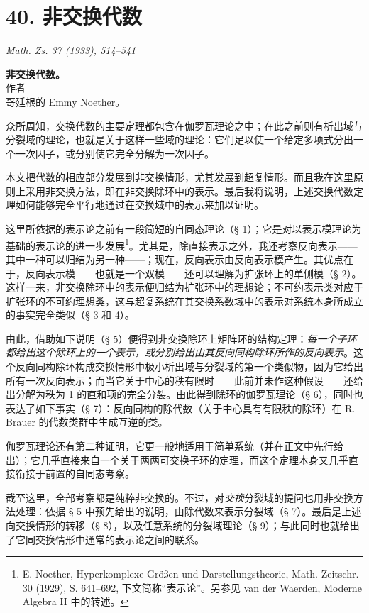 \section*{40. 非交换代数}

\begin{center}
\emph{Math. Zs. 37 (1933), 514--541}
\end{center}

\begin{center}
\textbf{非交换代数。}\\[0.5em]
作者\\[0.25em]
哥廷根的 Emmy Noether。
\end{center}

众所周知，交换代数的主要定理都包含在伽罗瓦理论之中；在此之前则有析出域与分裂域的理论，也就是关于这样一些域的理论：它们足以使一个给定多项式分出一个一次因子，或分别使它完全分解为一次因子。

本文把代数的相应部分发展到非交换情形，尤其发展到超复情形。而且我在这里原则上采用非交换方法，即在非交换除环中的表示。最后我将说明，上述交换代数定理如何能够完全平行地通过在交换域中的表示来加以证明。

这里所依据的表示论之前有一段简短的自同态理论（§ 1）；它是对以表示模理论为基础的表示论的进一步发展\footnote{E. Noether, Hyperkomplexe Größen und Darstellungstheorie, Math. Zeitschr. 30 (1929), S. 641--692, 下文简称“表示论”。另参见 van der Waerden, Moderne Algebra II 中的转述。}。尤其是，除直接表示之外，我还考察反向表示——其中一种可以归结为另一种——；现在，反向表示由反向表示模产生。其优点在于，反向表示模——也就是一个双模——还可以理解为扩张环上的单侧模（§ 2）。这样一来，非交换除环中的表示便归结为扩张环中的理想论；不可约表示类对应于扩张环的不可约理想类，这与超复系统在其交换系数域中的表示对系统本身所成立的事实完全类似（§ 3 和 4）。

由此，借助如下说明（§ 5）便得到非交换除环上矩阵环的结构定理：\emph{每一个子环都给出这个除环上的一个表示，或分别给出由其反向同构除环所作的反向表示}。这个反向同构除环构成交换情形中极小析出域与分裂域的第一个类似物，因为它给出所有一次反向表示；而当它关于中心的秩有限时——此前并未作这种假设——还给出分解为秩为 1 的直和项的完全分裂。由此得到除环的伽罗瓦理论（§ 6），同时也表达了如下事实（§ 7）：反向同构的除代数（关于中心具有有限秩的除环）在 R. Brauer 的代数类群中生成互逆的类。

伽罗瓦理论还有第二种证明，它更一般地适用于简单系统（并在正文中先行给出）；它几乎直接来自一个关于两两可交换子环的定理，而这个定理本身又几乎直接衔接于前置的自同态考察。

截至这里，全部考察都是纯粹非交换的。不过，对\emph{交换}分裂域的提问也用非交换方法处理：依据 § 5 中预先给出的说明，由除代数来表示分裂域（§ 7）。最后是上述向交换情形的转移（§ 8），以及任意系统的分裂域理论（§ 9）；与此同时也就给出了它同交换情形中通常的表示论之间的联系。

